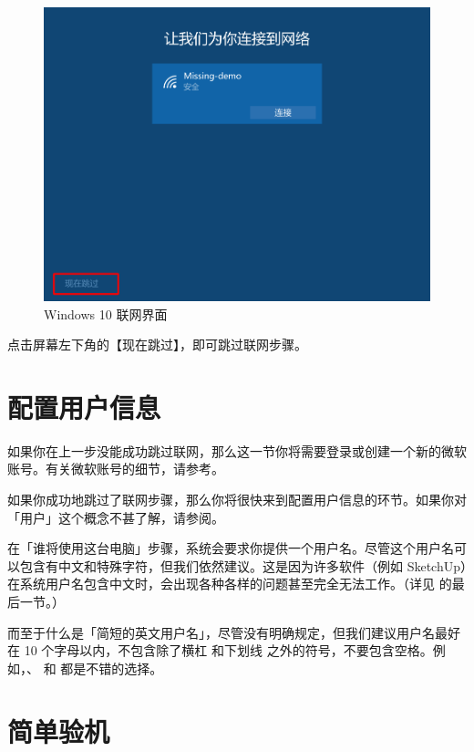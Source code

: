 \begin{figure}[htb!]
  \centering
  \includegraphics[width=.65\textwidth]{assets/appendix/Windows_10_skip_internet.png}
  \caption{Windows 10 联网界面}
  \label{fig:Windows_10_skip_internet}
\end{figure}

点击屏幕左下角的【现在跳过】，即可跳过联网步骤。

\section{配置用户信息}

\begin{note}
  如果你在上一步没能成功跳过联网，那么这一节你将需要登录或创建一个新的微软账号。有关微软账号的细节，请参考。
\end{note}

如果你成功地跳过了联网步骤，那么你将很快来到配置用户信息的环节。如果你对「用户」这个概念不甚了解，请参阅。

在「谁将使用这台电脑」步骤，系统会要求你提供一个用户名。尽管这个用户名可以包含有中文和特殊字符，但我们依然建议。这是因为许多软件（例如 SketchUp）在系统用户名包含中文时，会出现各种各样的问题甚至完全无法工作。（详见 的最后一节。）

而至于什么是「简短的英文用户名」，尽管没有明确规定，但我们建议用户名最好在 10 个字母以内，不包含除了横杠 \MissingVerb{-} 和下划线 \MissingVerb{_} 之外的符号，不要包含空格。例如，、  和  都是不错的选择。

\section{简单验机}

